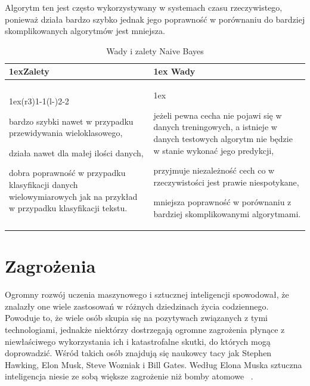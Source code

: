 Algorytm ten jest często wykorzystywany w systemach czasu rzeczywistego, ponieważ działa bardzo szybko jednak
jego poprawność w porównaniu do bardziej skomplikowanych algorytmów jest mniejsza.
\begin{table}[h]
    \begin{tabularx}{\linewidth}{>{\parskip1ex}X@{\kern4\tabcolsep}>{\parskip1ex}X}
    \toprule
    \hfil\bfseries Zalety
    &
    \hfil\bfseries Wady
    \\\cmidrule(r{3\tabcolsep}){1-1}\cmidrule(l{-\tabcolsep}){2-2}
    
    bardzo szybki nawet w przypadku przewidywania wieloklasowego,\par
    działa nawet dla małej ilości danych,\par
    dobra poprawność w przypadku klasyfikacji danych wielowymiarowych
    jak na przykład w przypadku klasyfikacji tekstu.\par
    
    &
    
    jeżeli pewna cecha nie pojawi się w danych treningowych, a istnieje w danych 
    testowych algorytm nie będzie w stanie wykonać jego predykcji,\par
    przyjmuje niezależność cech co w rzeczywistości jest prawie niespotykane,\par
    mniejsza poprawność w porównaniu z bardziej skomplikowanymi algorytmami.\par
    
    \\\bottomrule
    \end{tabularx}
    \caption{Wady i zalety Naive Bayes}
\end{table}

\section{Zagrożenia}
Ogromny rozwój uczenia maszynowego i sztucznej inteligencji spowodował, że znalazły one 
wiele zastosowań w różnych dziedzinach życia codziennego. Powoduje to, że wiele osób skupia się 
na pozytywach związanych
z tymi technologiami, jednakże niektórzy dostrzegają ogromne zagrożenia płynące z niewłaściwego 
wykorzystania ich i katastrofalne skutki, do których mogą doprowadzić. 
Wśród takich osób znajdują się naukowcy tacy jak Stephen Hawking, Elon Musk, Steve Wozniak i Bill Gates. 
Według Elona Muska sztuczna inteligencja niesie ze sobą większe zagrożenie niż bomby atomowe ~\cite{dangers}. 

